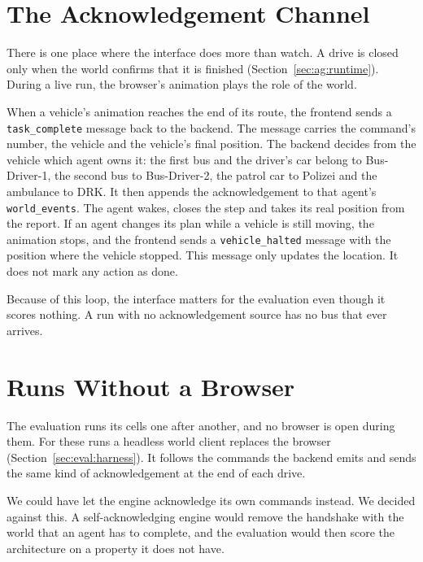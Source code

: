 \section{The Acknowledgement Channel}
\label{sec:ui:ack}

There is one place where the interface does more than watch. A drive is closed only when
the world confirms that it is finished (Section~\ref{sec:ag:runtime}). During a
live run, the browser's animation plays the role of the world.

When a vehicle's animation reaches the end of its route, the frontend sends a
\texttt{task\_complete} message back to the backend. The message carries the
command's number, the vehicle and the vehicle's final position. The backend
decides from the vehicle which agent owns it: the first bus and the driver's
car belong to Bus-Driver-1, the second bus to Bus-Driver-2, the patrol car to Polizei and
the ambulance to DRK. It then appends the acknowledgement to that agent's
\texttt{world\_events}. The agent wakes, closes the step and takes its real
position from the report. If an agent changes its plan while a vehicle is
still moving, the animation stops, and the frontend sends a
\texttt{vehicle\_halted} message with the position where the vehicle stopped.
This message only updates the location. It does not mark any action as done.

Because of this loop, the interface matters for the evaluation even though
it scores nothing. A run with no acknowledgement source has no bus that ever
arrives.

\section{Runs Without a Browser}
\label{sec:ui:headless}

The evaluation runs its cells one after another, and no browser is open
during them. For these runs a headless world client replaces the browser
(Section~\ref{sec:eval:harness}). It follows the commands the backend emits
and sends the same kind of acknowledgement at the end of each drive.

We could have let the engine acknowledge its own commands instead. We decided
against this. A self-acknowledging engine would remove the handshake with the
world that an agent has to complete, and the evaluation would then score the
architecture on a property it does not have.

